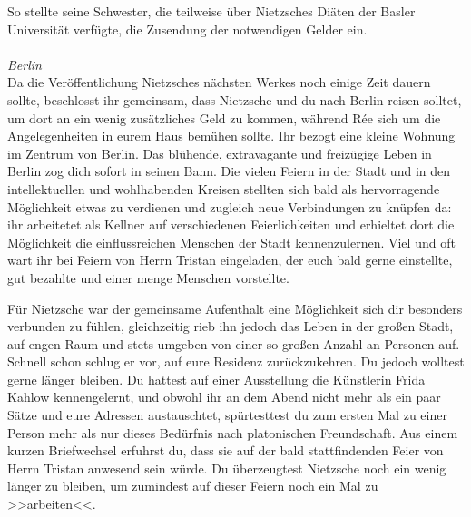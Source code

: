 \documentclass[12pt, a4paper, openany]{report}
\begin{document}
So stellte seine Schwester, die teilweise über Nietzsches Diäten der Basler Universität verfügte, die Zusendung der notwendigen Gelder ein.
\\
\\
\textit{Berlin}\\
Da die Veröffentlichung Nietzsches nächsten Werkes noch einige Zeit dauern sollte, beschlosst ihr gemeinsam, dass Nietzsche und du nach Berlin reisen solltet, um dort an ein wenig zusätzliches Geld zu kommen, während Rée sich um die Angelegenheiten in eurem Haus bemühen sollte.
Ihr bezogt eine kleine Wohnung im Zentrum von Berlin. 
Das blühende, extravagante und freizügige Leben in Berlin zog dich sofort in seinen Bann. 
Die vielen Feiern in der Stadt und in den intellektuellen und wohlhabenden Kreisen stellten sich bald als hervorragende Möglichkeit etwas zu verdienen und zugleich neue Verbindungen zu knüpfen da:
ihr arbeitetet als Kellner auf verschiedenen Feierlichkeiten und erhieltet dort die Möglichkeit die einflussreichen Menschen der Stadt kennenzulernen. 
Viel und oft wart ihr bei Feiern von Herrn Tristan eingeladen, der euch bald gerne einstellte, gut bezahlte und einer menge Menschen vorstellte.

Für Nietzsche war der gemeinsame Aufenthalt eine Möglichkeit sich dir besonders verbunden zu fühlen, gleichzeitig rieb ihn jedoch das Leben in der großen Stadt, auf engen Raum und stets umgeben von einer so großen Anzahl an Personen auf. 
Schnell schon schlug er vor, auf eure Residenz zurückzukehren. 
Du jedoch wolltest gerne länger bleiben.
Du hattest auf einer Ausstellung die Künstlerin Frida Kahlow kennengelernt, und obwohl ihr an dem Abend nicht mehr als ein paar Sätze und eure Adressen austauschtet, spürtesttest du zum ersten Mal zu einer Person mehr als nur dieses Bedürfnis nach platonischen Freundschaft. 
Aus einem kurzen Briefwechsel erfuhrst du, dass sie auf der bald stattfindenden Feier von Herrn Tristan anwesend sein würde. 
Du überzeugtest Nietzsche noch ein wenig länger zu bleiben, um zumindest auf dieser Feiern noch ein Mal zu >>arbeiten<<.
\end{document}
